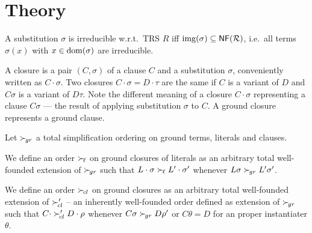 
\chapter{Theory}






\begin{definition}
    A substitution \( \sigma \) is irreducible w.r.t.~TRS \( R \)
    iff
    \( \operatorname{img}(\sigma)\subseteq\mathsf{NF}(\mathcal{R}) \),
    i.e.~all terms \(\sigma(x)\) with
    \( x\in\operatorname{dom}(\sigma) \) are irreducible.
\end{definition}

\begin{definition}
    A closure is a pair $(C,\sigma)$ of a clause $C$ and a substitution $\sigma$,
    conveniently written as $C\cdot\sigma$. Two closures $C\cdot\sigma = D\cdot\tau$
    are the same if $C$ is a variant of $D$ and $C\sigma$ is a variant of $D\tau$.
    Note the different meaning of a closure $C\cdot\sigma$ representing a clause $C\sigma$
    --- the result of applying substitution $\sigma$ to $C$.
    A ground closure represents a ground clause.
\end{definition}

\begin{definition}
    \cite{NR2001}
\end{definition}

\begin{definition}
    Let $\mathrel\succ_{\!gr}$ a total simplification ordering on ground terms, literals and clauses.

    We define an order $\mathrel\succ_{\!\ell}$ on ground closures of literals
    as an arbitrary total well-founded extension of $\mathrel\succ_{\!gr}$
    such that
    $L\cdot\sigma\mathrel\succ_{\!\ell} L'\cdot\sigma'$ whenever
    $L\sigma\mathrel\succ_{\!gr} L'\sigma'$.

    We define an order \( \mathrel\succ_{\!cl} \) on ground closures
    as an arbitrary total well-founded extension of
    $\mathrel\succ_{\!cl}'$ -- an inherently well-founded order defined as extension of $\mathrel\succ_{\!gr}$
    such that
    $C\cdot\mathrel\succ_{\!cl}' D\cdot\rho$ whenever
    $C\sigma\mathrel\succ_{\!gr} D\rho'$ or $C\theta = D$ for an proper instantiater $\theta$.
\end{definition}






